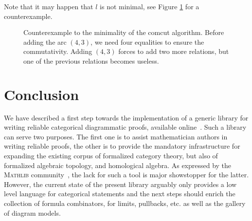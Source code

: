 \documentclass[a4paper,UKenglish,cleveref, autoref, thm-restate]{lipics-v2021}
\begin{document}
\begin{remark}
Note that it may happen that $l$ is not minimal, see Figure \ref{fig:counter-example_comcut} for a counterexample.
\begin{figure}[h]
  \begin{center}
  \end{center}
  \caption{Counterexample to the minimality of the comcut algorithm. Before adding the arc $(4,3)$, we need four equalities to ensure the commutativity. Adding $(4,3)$ forces to add two more relations, but one of the previous relations becomes useless. \label{fig:counter-example_comcut}}
\end{figure}
\end{remark}





\section{Conclusion}\label{sec:concl}

We have described a first step towards the implementation of a generic library for writing reliable categorical diagrammatic proofs, available online~\cite{repo}. Such a library can serve two purposes. The first one is to assist mathematician authors in writing reliable proofs, the other is to provide the mandatory infrastructure for expanding the existing corpus of formalized category theory, but also of formalized algebraic topology, and homological algebra. As expressed by the \textsc{Mathlib} community~\cite{mathlibzulip}, the lack for such a tool is major showstopper for the latter. However, the current state of the present library arguably only provides a low level language for categorical statements and the next steps should enrich the collection of formula combinators, \eg{} for limits, pullbacks, etc. as well as the gallery of diagram models.
\end{document}
